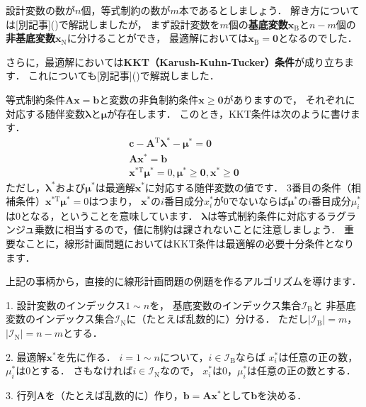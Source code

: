 ﻿\documentclass[a4paper]{jsarticle}
\begin{document}
設計変数の数が$n$個，等式制約の数が$m$本であるとしましょう．
解き方については[別記事]()で解説しましたが，
まず設計変数を$m$個の{\bf 基底変数}$\boldsymbol{x}_{\mathrm{B}}$と$n-m$個の{\bf 非基底変数}$\boldsymbol{x}_{\mathrm{N}}$に分けることができ，
最適解においては$\boldsymbol{x}_{\mathrm{B}}=\boldsymbol{0}$となるのでした．

さらに，最適解においては{\bf KKT（Karush-Kuhn-Tucker）条件}が成り立ちます．
これについても[別記事]()で解説しました．

等式制約条件$\boldsymbol{A}\boldsymbol{x}=\boldsymbol{b}$と変数の非負制約条件$\boldsymbol{x}\geq\boldsymbol{0}$がありますので，
それぞれに対応する随伴変数$\boldsymbol{\lambda}$と$\boldsymbol{\mu}$が存在します．
このとき，KKT条件は次のように書けます．
\begin{align*}
\boldsymbol{c}-\boldsymbol{A}^{\mathrm{T}}\boldsymbol{\lambda}^{*}-\boldsymbol{\mu}^{*}=\boldsymbol{0}
\\
\boldsymbol{A}\boldsymbol{x}^{*}=\boldsymbol{b}
\\
\boldsymbol{x}^{*\mathrm{T}}\boldsymbol{\mu}^{*}=0, \boldsymbol{\mu}^{*}\geq\boldsymbol{0}, \boldsymbol{x}^{*}\geq\boldsymbol{0}
\end{align*}
ただし，$\boldsymbol{\lambda}^{*}$および$\boldsymbol{\mu}^{*}$は最適解$\boldsymbol{x}^{*}$に対応する随伴変数の値です．
3番目の条件（相補条件）$\boldsymbol{x}^{*\mathrm{T}}\boldsymbol{\mu}^{*}=0$はつまり，
$\boldsymbol{x}^{*}$の$i$番目成分$x_{i}^{*}$が0でないならば$\boldsymbol{\mu}^{*}$の$i$番目成分$\mu_{i}^{*}$は0となる，ということを意味しています．
$\boldsymbol{\lambda}$は等式制約条件に対応するラグランジュ乗数に相当するので，値に制約は課されないことに注意しましょう．
重要なことに，線形計画問題においてはKKT条件は最適解の必要十分条件となります．

上記の事柄から，直接的に線形計画問題の例題を作るアルゴリズムを導けます．

1. 設計変数のインデックス$1\sim n$を，
基底変数のインデックス集合$\mathcal{I}_{\mathrm{B}}$と
非基底変数のインデックス集合$\mathcal{I}_{\mathrm{N}}$に（たとえば乱数的に）分ける．
ただし$|\mathcal{I}_{\mathrm{B}}|=m$，$|\mathcal{I}_{\mathrm{N}}|=n-m$とする．

2. 最適解$\boldsymbol{x}^{*}$を先に作る．
$i=1\sim n$について，$i\in\mathcal{I}_{\mathrm{B}}$ならば
$x_{i}^{*}$は任意の正の数，$\mu_{i}^{*}$は0とする．
さもなければ$i\in\mathcal{I}_{\mathrm{N}}$なので，
$x_{i}^{*}$は0，$\mu_{i}^{*}$は任意の正の数とする．

3. 行列$\boldsymbol{A}$を（たとえば乱数的に）作り，$\boldsymbol{b}=\boldsymbol{A}\boldsymbol{x}^{*}$として$\boldsymbol{b}$を決める．
\end{document}

